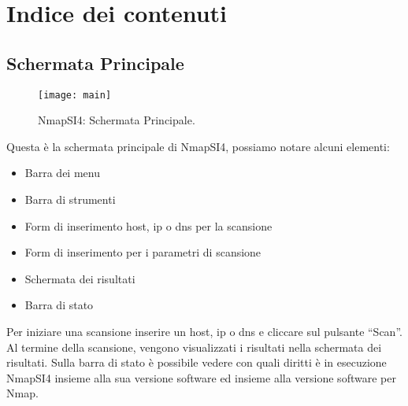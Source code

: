 
\chapter{Indice dei contenuti}
\label{ch:Contents}

\section{Schermata Principale}
\label{sec:ContentsMain}

\begin{figure}[h]
  \centering
  \texttt{[image: main]}
  \caption{NmapSI4: Schermata Principale.}
  \label{fig:ContentsMain}
\end{figure}
Questa \`e la schermata principale di NmapSI4, possiamo notare alcuni elementi:
\begin{itemize}
\item Barra dei menu
\item Barra di strumenti
\item Form di inserimento host, ip o dns per la scansione
\item Form di inserimento per i parametri di scansione
\item Schermata dei risultati
\item Barra di stato
\end{itemize}
Per iniziare una scansione inserire un host, ip o dns e cliccare sul pulsante 
``Scan''. Al termine della scansione, vengono visualizzati i risultati nella 
schermata dei risultati. Sulla barra di stato \`e possibile vedere con quali 
diritti \`e in esecuzione NmapSI4 insieme alla sua versione software ed 
insieme alla versione software per Nmap.

